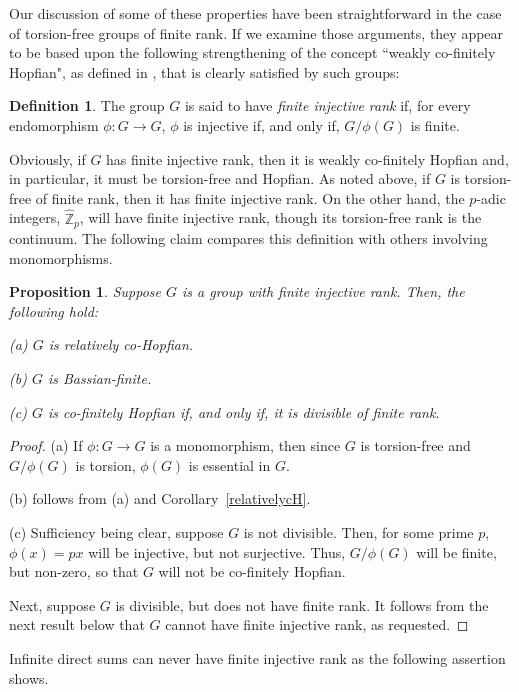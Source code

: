 \documentclass[12pt]{amsart}
\newtheorem{proposition}[theorem]{Proposition}
\theoremstyle{definition}
\newtheorem{definition}[theorem]{Definition}
\def\Z{{\mathbb Z}}
\begin{document}
\medskip

Our discussion of some of these properties have been straightforward in the case of torsion-free groups of finite rank. If we examine those arguments, they appear to be based upon the following strengthening of the concept ``weakly co-finitely Hopfian", as defined in \cite{DK}, that is clearly satisfied by such groups:

\begin{definition}
The group $G$ is said to have {\it finite injective rank} if, for every endomorphism $\phi:G\to G$, $\phi$ is injective if, and only if, $G/\phi(G)$ is finite.
\end{definition}

Obviously, if $G$ has finite injective rank, then it is weakly co-finitely Hopfian and, in particular, it must be torsion-free and Hopfian. As noted above, if $G$ is torsion-free of finite rank, then it has finite injective rank. On the other hand, the $p$-adic integers, $\hat \Z_p$, will have finite injective rank, though its torsion-free rank is the continuum. The following claim compares this definition with others involving monomorphisms.

\begin{proposition} Suppose $G$ is a group with finite injective rank. Then, the following hold:

(a)  $G$ is relatively co-Hopfian.

(b)  $G$ is Bassian-finite.

(c)  $G$ is co-finitely Hopfian if, and only if, it is divisible of finite rank.
\end{proposition}

\begin{proof} (a) If $\phi:G\to G$ is a monomorphism, then since $G$ is torsion-free and $G/\phi(G)$ is torsion, $\phi(G)$ is essential in $G$.

(b) follows from (a) and Corollary~\ref{relativelycH}.

(c) Sufficiency being clear, suppose $G$ is not divisible. Then, for some prime $p$, $\phi(x)=px$ will be injective, but not surjective. Thus, $G/\phi(G)$ will be finite, but non-zero, so that $G$ will not be co-finitely Hopfian.

Next, suppose $G$ is divisible, but does not have finite rank. It follows from the next result below that $G$ cannot have finite injective rank, as requested.
\end{proof}

Infinite direct sums can never have finite injective rank as the following assertion shows.
\end{document}
